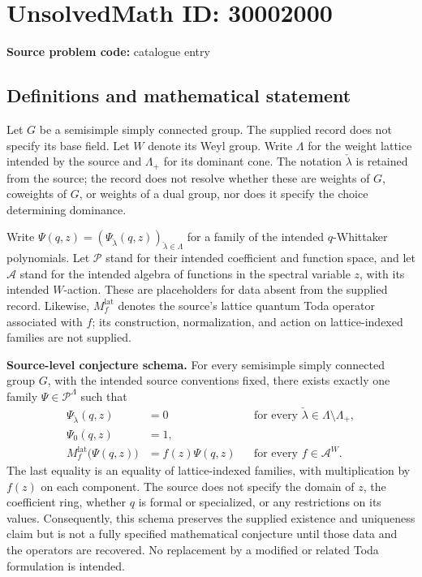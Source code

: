 \documentclass[11pt]{article}
\begin{document}
\section*{UnsolvedMath ID: 30002000}
\textbf{Source problem code:} catalogue entry
\subsection{Definitions and mathematical statement}
Let \(G\) be a semisimple simply connected group. The supplied record does not specify its base field. Let \(W\) denote its Weyl group. Write \(\Lambda\) for the weight lattice intended by the source and \(\Lambda_+\) for its dominant cone. The notation \(\check\lambda\) is retained from the source; the record does not resolve whether these are weights of \(G\), coweights of \(G\), or weights of a dual group, nor does it specify the choice determining dominance.

Write \(\Psi(q,z)=(\Psi_{\check\lambda}(q,z))_{\check\lambda\in\Lambda}\) for a family of the intended \(q\)-Whittaker polynomials. Let \(\mathcal P\) stand for their intended coefficient and function space, and let \(\mathcal A\) stand for the intended algebra of functions in the spectral variable \(z\), with its intended \(W\)-action. These are placeholders for data absent from the supplied record. Likewise, \(M_f^{\mathrm{lat}}\) denotes the source's lattice quantum Toda operator associated with \(f\); its construction, normalization, and action on lattice-indexed families are not supplied.

\textbf{Source-level conjecture schema.} For every semisimple simply connected group \(G\), with the intended source conventions fixed, there exists exactly one family \(\Psi\in\mathcal P^{\Lambda}\) such that
\[
\begin{aligned}
\Psi_{\check\lambda}(q,z)&=0 &&\text{for every }\check\lambda\in\Lambda\setminus\Lambda_+,\\
\Psi_0(q,z)&=1,\\
M_f^{\mathrm{lat}}\bigl(\Psi(q,z)\bigr)&=f(z)\Psi(q,z)
&&\text{for every }f\in\mathcal A^W.
\end{aligned}
\]
The last equality is an equality of lattice-indexed families, with multiplication by \(f(z)\) on each component. The source does not specify the domain of \(z\), the coefficient ring, whether \(q\) is formal or specialized, or any restrictions on its values. Consequently, this schema preserves the supplied existence and uniqueness claim but is not a fully specified mathematical conjecture until those data and the operators are recovered. No replacement by a modified or related Toda formulation is intended.
\end{document}
